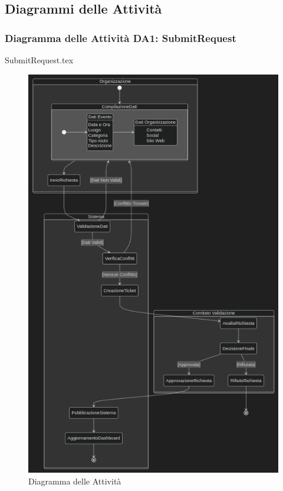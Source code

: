 \documentclass[12pt]{article}
\begin{document}
\subsection{Diagrammi delle Attività}

\subsubsection{Diagramma delle Attività DA1: SubmitRequest}
{SubmitRequest.tex}

\begin{figure}[H]
    \includegraphics[width=\textwidth, height=\textheight,keepaspectratio]{Immagini/DA/Iterazione 1/SDSubmitRequest.png}
        \caption{Diagramma delle Attività}
        \label{fig:diagrammaDA1}
\end{figure}
\end{document}
